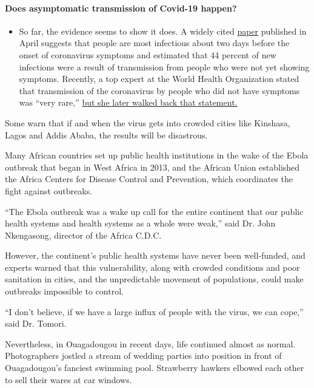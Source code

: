\begin{itemize}
{  \paragraph{Does asymptomatic transmission of Covid-19
  happen?}\label{does-asymptomatic-transmission-of-covid-19-happen}}

  \begin{itemize}
  \tightlist
  \item
    So far, the evidence seems to show it does. A widely cited
    \href{https://www.nature.com/articles/s41591-020-0869-5}{paper}
    published in April suggests that people are most infectious about
    two days before the onset of coronavirus symptoms and estimated that
    44 percent of new infections were a result of transmission from
    people who were not yet showing symptoms. Recently, a top expert at
    the World Health Organization stated that transmission of the
    coronavirus by people who did not have symptoms was ``very rare,''
    \href{https://www.nytimes.com/2020/06/09/world/coronavirus-updates.html?action=click\&pgtype=Article\&state=default\&region=MAIN_CONTENT_3\&context=storylines_faq\#link-1f302e21}{but
    she later walked back that statement.}
  \end{itemize}
\end{itemize}

Some warn that if and when the virus gets into crowded cities like
Kinshasa, Lagos and Addis Ababa, the results will be disastrous.

Many African countries set up public health institutions in the wake of
the Ebola outbreak that began in West Africa in 2013, and the African
Union established the Africa Centers for Disease Control and Prevention,
which coordinates the fight against outbreaks.

``The Ebola outbreak was a wake up call for the entire continent that
our public health systems and health systems as a whole were weak,''
said Dr. John Nkengasong, director of the Africa C.D.C.

However, the continent's public health systems have never been
well-funded, and experts warned that this vulnerability, along with
crowded conditions and poor sanitation in cities, and the unpredictable
movement of populations, could make outbreaks impossible to control.

``I don't believe, if we have a large influx of people with the virus,
we can cope,'' said Dr. Tomori.

Nevertheless, in Ouagadougou in recent days, life continued almost as
normal. Photographers jostled a stream of wedding parties into position
in front of Ouagadougou's fanciest swimming pool. Strawberry hawkers
elbowed each other to sell their wares at car windows.

